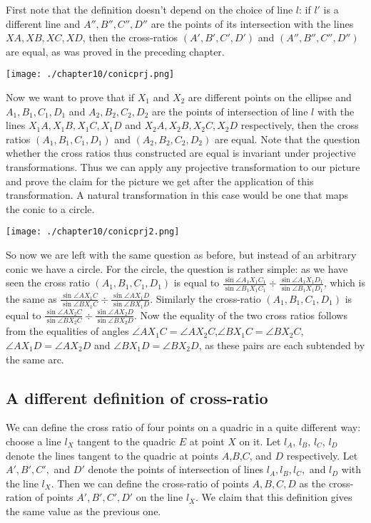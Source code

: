 First note that the definition doesn't depend on the choice of line $l$: if $l'$ is a different line and $A'',B'',C'',D''$ are the points of its intersection with the lines $XA,XB,XC,XD$, then the cross-ratios $(A',B',C',D')$ and $(A'',B'',C'',D'')$ are equal, as was proved in the preceding chapter.

\texttt{[image: ./chapter10/conicprj.png]}

Now we want to prove that if $X_1$ and $X_2$ are different points on the ellipse and $A_1,B_1,C_1,D_1$ and $A_2,B_2,C_2,D_2$ are the points of intersection of line $l$ with the lines $X_1A,X_1B,X_1C,X_1D$ and $X_2A,X_2B,X_2C,X_2D$ respectively, then the cross ratios $(A_1,B_1,C_1,D_1)$ and $(A_2,B_2,C_2,D_2)$ are equal. Note that the question whether the cross ratios thus constructed are equal is invariant under projective transformations. Thus we can apply any projective transformation to our picture and prove the claim for the picture we get after the application of this transformation. A natural transformation in this case would be one that maps the conic to a circle.

\texttt{[image: ./chapter10/conicprj2.png]}

So now we are left with the same question as before, but instead of an arbitrary conic we have a circle. For the circle, the question is rather simple: as we have seen the cross ratio $(A_1,B_1,C_1,D_1)$ is equal to $\frac{\sin\angle A_1X_1 C_1}{\sin \angle B_1X_1C_1}\div\frac{\sin\angle A_1X_1D_1}{\sin \angle B_1X_1D_1}$, which is the same as $\frac{\sin\angle AX_1 C}{\sin \angle BX_1C}\div\frac{\sin\angle AX_1D}{\sin \angle BX_1D}$. Similarly the cross-ratio $(A_1,B_1,C_1,D_1)$ is equal to $\frac{\sin\angle AX_2 C}{\sin \angle BX_2C}\div\frac{\sin\angle AX_2D}{\sin \angle BX_2D}$. Now the equality of the two cross ratios follows from the equalities of angles $\angle AX_1C=\angle AX_2C$,$\angle BX_1C=\angle BX_2C$, $\angle AX_1D=\angle AX_2D$ and $\angle BX_1D=\angle BX_2D$, as these pairs are each subtended by the same arc.

\subsection{A different definition of cross-ratio}

We can define the cross ratio of four points on a quadric in a quite different way: choose a line $l_X$ tangent to the quadric $E$ at point $X$ on it. Let $l_A$, $l_B$, $l_C$, $l_D$ denote the lines tangent to the quadric at points $A$,$B$,$C$, and $D$ respectively. Let $A',B',C',$ and $D'$ denote the points of intersection of lines $l_A,l_B,l_C,$ and $l_D$ with the line $l_X$. Then we can define the cross-ratio of points $A,B,C,D$ as the cross-ration of points $A',B',C',D'$ on the line $l_X$. We claim that this definition gives the same value as the previous one.

